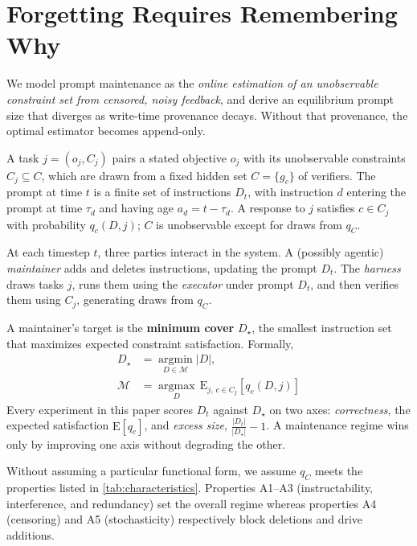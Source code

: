 \section{Forgetting Requires Remembering Why}
\label{sec:theory}



We model prompt maintenance as the \emph{online estimation of an unobservable
constraint set from censored, noisy feedback}, and derive an equilibrium prompt size that diverges as
write-time provenance decays. Without that provenance, the optimal estimator becomes append-only.

A task $j = (o_j, C_j)$ pairs a stated objective $o_j$ with its unobservable constraints $C_j \subseteq C$,
which are drawn from a fixed hidden set $C = \{g_c\}$ of verifiers. The prompt at time $t$ is a finite set of
instructions $D_t$, with instruction $d$ entering the prompt at time $\tau_d$ and having age $a_d = t -
\tau_d$. A response to $j$ satisfies $c \in C_j$ with probability $q_c(D, j)$; $C$ is unobservable except for
draws from $q_C$.

At each timestep $t$, three parties interact in the system. A (possibly agentic) \emph{maintainer} adds and
deletes instructions, updating the prompt $D_t$. The \emph{harness} draws tasks $j$, runs them using the
\emph{executor} under prompt $D_t$, and then verifies them using $C_j$, generating draws from $q_C$.

A maintainer's target is the \textbf{minimum cover} $D_\star$, the smallest instruction set that maximizes
expected constraint satisfaction. Formally,
\begin{equation}
  \begin{split}
    D_\star &= \operatorname*{argmin}_{D \in \mathcal{M}} |D|, \\
    \mathcal{M} &= \operatorname*{argmax}_{D}\, \mathrm{E}_{j,\,c \in C_j}[q_c(D, j)]
  \end{split}
\end{equation}
Every experiment in this paper scores $D_t$ against $D_\star$ on two axes: \emph{correctness}, the expected
satisfaction $\mathrm{E}[q_c]$, and \emph{excess size}, $\frac{|D_t|}{|D_\star|} - 1$. A maintenance regime
wins only by improving one axis without degrading the other.

Without assuming a particular functional form, we assume $q_C$ meets the properties listed in
\autoref{tab:characteristics}. Properties A1–A3 (instructability, interference, and redundancy) set the
overall regime whereas properties A4 (censoring) and A5 (stochasticity) respectively block deletions and
drive additions.

